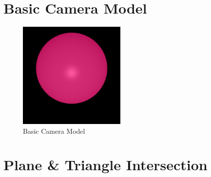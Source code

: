 \documentclass{article}
\begin{document}
\section{Basic Camera Model}

\begin{figure}
  \begin{center}
  \includegraphics[width=200px]{Images/basic.png}
  \caption{Basic Camera Model}
  \label{fig:basiccammod}
  \end{center}
\end{figure}

\section{Plane & Triangle Intersection}
\end{document}
